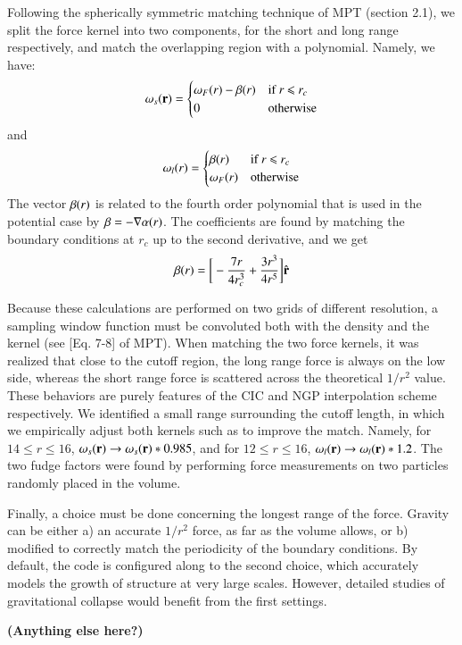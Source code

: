 Following the spherically symmetric matching technique of MPT (section 2.1), 
we split  the force kernel into two components, for the short and long range respectively, and 
match the overlapping region with a polynomial. Namely, we have:
\begin{eqnarray}
{\bf \omega}_{s}({\bf r}) = \begin{cases} {\bf \omega}_{F}(r) -  {\bf \beta}(r) &\mbox{if  } \mbox{$r$ $\le$ $r_{c}$ } \\
0 & \mbox{otherwise} 
\end{cases}
\end{eqnarray}
and
\begin{eqnarray}
{\bf \omega}_{l}(r) = \begin{cases} {\bf \beta}(r) &\mbox{if  } \mbox{$r$ $\le$ $r_{c}$ } \\
 {\bf\omega}_{F}(r)  &\mbox{otherwise} 
\end{cases}
\end{eqnarray}
The vector $ {\bf \beta}(r)$ is related to the fourth order polynomial that is used in the potential case by
 $ {\bf \beta} = - {\bf \nabla} \alpha(r)$. The coefficients are found by matching the boundary conditions at $r_{c}$ up to the second derivative,
 and we get
  \begin{eqnarray}
   {\bf \beta}(r) = \bigg[ -\frac{7 r}{4 r_{c}^{3}} + \frac{3 r^{3}}{4 r^{5}}\bigg] \hat{\bf r}
  \end{eqnarray}

Because these calculations are performed on two grids of different resolution, a sampling window function must be convoluted 
both with the density and the kernel (see [Eq. 7-8] of MPT).
When matching the two  force kernels, it was realized that close to the cutoff region, the long range force is always on the low side, whereas 
the short range force is scattered across the theoretical $1/r^2$ value. These behaviors are purely features of the CIC and NGP interpolation scheme 
respectively. We identified a small range surrounding the cutoff length, in which we empirically adjust both kernels such as to improve 
the match. Namely, for $14 \le r \le 16$, ${\bf \omega}_{s}({\bf r}) \rightarrow {\bf \omega}_{s}({\bf r})*0.985$,
and for  $12 \le r \le 16$, ${\bf \omega}_{l}({\bf r}) \rightarrow {\bf \omega}_{l}({\bf r})*1.2$.
The two fudge factors were found by performing force measurements on two particles randomly placed in the volume.

Finally, a choice must be done concerning the longest range of the force. Gravity can be either a) an accurate $1/r^2$ force, as far as the volume allows, 
or b) modified to correctly match the periodicity of the boundary conditions. By default, the code is configured along to the second choice,
which accurately models the growth of structure at very large scales. However, detailed studies of gravitational collapse would benefit 
from the first settings.


{\bf (Anything else here?)}
